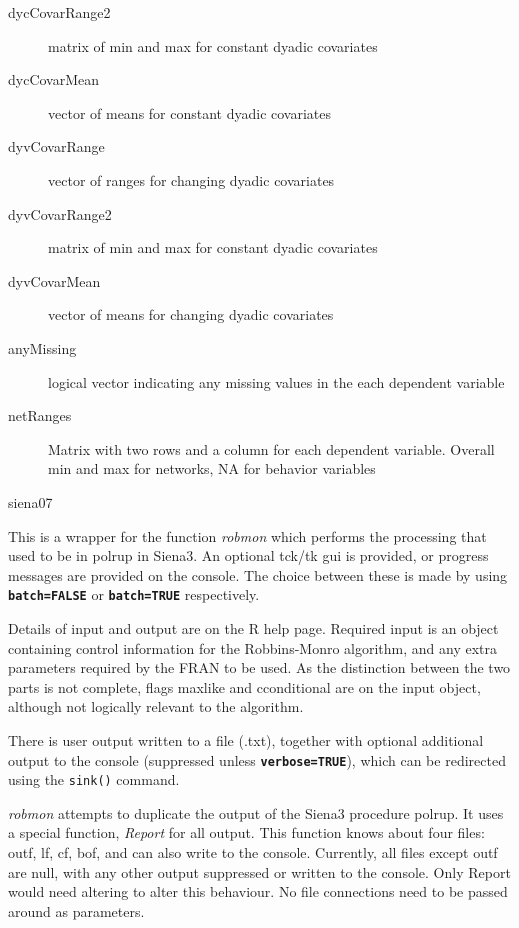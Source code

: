 \documentclass[12pt,a4paper]{article}
\makeatletter
\renewcommand{\=}{\,=\,}
\newcommand{\+}{\,+\,}
\newcommand{\nm}[1]{\textsf{ #1}}
\newcommand{\nnm}[1]{\textsf{\textit{#1}}}
\newcommand{\nmm}[1]{\nnm{#1}}
\renewcommand{\section}{\@startsection{section}{1}
                {0pt}{\baselineskip}{0.5\baselineskip}
                {\centering\sffamily} }
\newcommand{\sfn}[1]{\textbf{\texttt{#1}}}
\newcommand{\R}{{\sf R }}
\newcommand{\SI}{{\sf Siena3 }}
\newcommand{\Sn}{{\sf Siena3}}
\makeatother
\begin{document}
\begin{description}
\item[dycCovarRange2] matrix of min and max for constant dyadic covariates
\item[dycCovarMean] vector of means for constant dyadic covariates
\item[dyvCovarRange] vector of ranges for changing dyadic covariates
\item[dyvCovarRange2] matrix of min and max for constant dyadic covariates
\item[dyvCovarMean] vector of means for changing dyadic covariates
\item[anyMissing] logical vector indicating any missing values in the each
  dependent variable
\item[netRanges] Matrix with two rows and a column for each dependent
  variable. Overall min and max for networks, NA for behavior variables
\end{description}


\section{siena07}

This is a wrapper for the function \nmm{robmon} which performs the processing
that used to be in \nm{polrup} in \Sn.  An optional tck/tk gui is provided,
or progress messages are provided on the console. The choice between these is
made by using \sfn{batch=FALSE} or \sfn{batch=TRUE} respectively.

Details of input and output are on the \R help page. Required input is an object
containing control information for the Robbins-Monro algorithm, and any extra
parameters required by the \nm{FRAN} to be used. As the distinction between the
two parts is not complete, flags \nm{maxlike} and \nm{cconditional} are on the
input object, although not logically relevant to the algorithm.

There is user output written to a file (.txt), together with optional additional
output to the console (suppressed unless \sfn{verbose=TRUE}), which can be
redirected using the \verb|sink()| command.

\nnm{robmon} attempts to duplicate the output of
the \SI procedure \nm{polrup}. It uses
a special function, \nnm{Report} for all output.
This function knows about four files:
\nm{outf}, \nm{lf}, \nm{cf}, \nm{bof}, and can also write to the console.
Currently, all files except \nm{outf} are null, with any other output suppressed
or written to the console. Only \nm{Report} would need altering to alter this
behaviour.  No file connections need to be passed around as parameters.
\end{document}
